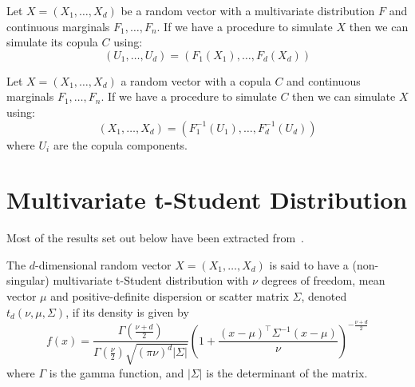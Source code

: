 \documentclass[11pt,fleqn]{book} %
\begin{document}
\begin{corollary}
	\label{cor:cop2}
	Let $X=(X_1, \dots, X_d)$ be a random vector with a multivariate 
	distribution $F$ and continuous marginals $F_1, \dots, F_n$.
	If we have a procedure to simulate $X$ then we can simulate 
	its copula $C$ using:
	\begin{displaymath}
		(U_1, \dots, U_d) = (F_1(X_1), \dots, F_d(X_d))
	\end{displaymath}
\end{corollary}

\begin{corollary}
	\label{cor:cop3}
	Let $X=(X_1, \dots, X_d)$ a random vector with a copula $C$
	and continuous marginals $F_1, \dots, F_n$. If we have a
	procedure to simulate $C$ then we can simulate $X$ using:
	\begin{displaymath}
		(X_1, \dots, X_d) = (F_1^{-1}(U_1), \dots, F_d^{-1}(U_d))
	\end{displaymath}
	where $U_i$ are the copula components.
\end{corollary}

\section{Multivariate t-Student Distribution}
\label{ap:mtsd}

Most of the results set out below have been extracted from~\cite{kotz:2004}.

\begin{definition}
	The $d$-dimensional random vector $X=(X_1,\dots,X_d)$ is said to have a 
	(non-singular) multivariate t-Student distribution with $\nu$ degrees of freedom, 
	mean vector $\mu$ and positive-definite dispersion or scatter matrix $\Sigma$, 
	denoted $t_d(\nu,\mu,\Sigma)$, if its density is given by
	\begin{displaymath}
		f(x)=\frac{\Gamma\left(\frac{\nu+d}{2}\right)}{\Gamma\left(\frac{\nu}{2}\right)\sqrt{(\pi \nu)^d |\Sigma|}}
		\left(
		1+ \frac{(x-\mu)^\top\Sigma^{-1}(x-\mu)}{\nu}
		\right)^{-\frac{\nu+d}{2}}
	\end{displaymath}
	\noindent where $\Gamma$ is the gamma function, and $|\Sigma|$ is the 
	determinant of the matrix.
\end{definition}
\end{document}
